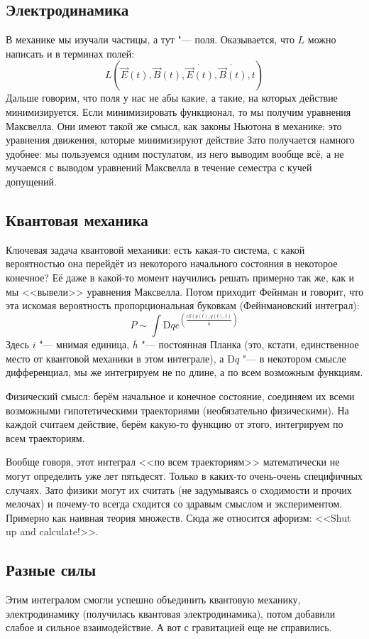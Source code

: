 \subsection{Электродинамика}
	В механике мы изучали частицы, а тут "--- поля.
	Оказывается, что $L$ можно написать и в терминах полей:
	\[
		L(\vec E(t), \vec B(t), \dot{\vec E(t)}, \dot{\vec B(t)}, t)
	\]
	Дальше говорим, что поля у нас не абы какие, а такие, на которых действие минимизируется.
	Если минимизировать функционал, то мы получим уравнения Максвелла.
	Они имеют такой же смысл, как законы Ньютона в механике: это уравнения движения, которые минимизируют действие
	Зато получается намного удобнее: мы пользуемся одним постулатом, из него выводим вообще всё,
	а не мучаемся с выводом уравнений Максвелла в течение семестра с кучей допущений.

\subsection{Квантовая механика}
	Ключевая задача квантовой механики: есть какая-то система, с какой вероятностью она перейдёт
	из некоторого начального состояния в некоторое конечное?
	Её даже в какой-то момент научились решать примерно так же, как и мы <<вывели>> уравнения Максвелла.
	Потом приходит Фейнман и говорит, что эта искомая вероятность пропорциональная буковкам (Фейнмановский интеграл):
	\[
		P \sim \int \mathrm{D}q e^{\left(\frac{i S(q(t),\dot q(t), t)}{\bar h}\right)}
	\]
	Здесь $i$ "--- мнимая единица, $\bar h$ "--- постоянная Планка (это, кстати, единственное место от квантовой механики в этом интеграле),
	а $\mathrm{D}q$ "--- в некотором смысле дифференциал, мы же интегрируем не по длине, а по всем возможным функциям.

	Физический смысл: берём начальное и конечное состояние, соединяем их всеми возможными гипотетическими траекториями (необязательно физическими).
	На каждой считаем действие, берём какую-то функцию от этого, интегрируем по всем траекториям.
	
	Вообще говоря, этот интеграл <<по всем траекториям>> математически не могут определить уже лет пятьдесят.
	Только в каких-то очень-очень специфичных случаях.
	Зато физики могут их считать (не задумываясь о сходимости и прочих мелочах) и почему-то всегда сходится со здравым смыслом и экспериментом.
	Примерно как наивная теория множеств.
	Сюда же относится афоризм: <<Shut up and calculate!>>.

\subsection{Разные силы}
	Этим интегралом смогли успешно объединить квантовую механику, электродинамику (получилась квантовая электродинамика),
	потом добавили слабое и сильное взаимодействие.
	А вот с гравитацией еще не справились.

